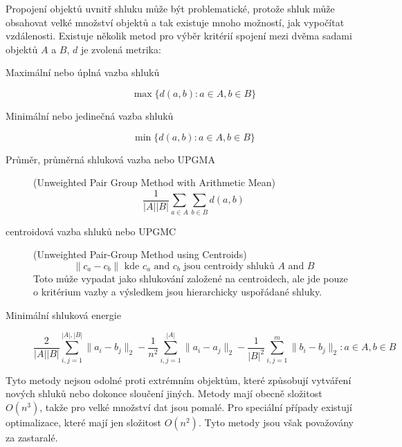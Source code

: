 \begin{description}
Propojení objektů uvnitř shluku může být problematické, protože shluk může obsahovat velké množství objektů a tak existuje mnoho možností, jak vypočítat vzdálenosti. Existuje několik metod pro výběr kritérií spojení mezi dvěma sadami objektů $A$ a $B$, $d$ je zvolená metrika:
\begin{description}
\item[Maximální nebo úplná vazba shluků] $$\max\{d(a,b) : a \in A, b \in B\}$$
\item[Minimální nebo jedinečná vazba shluků] $$\min\{d(a,b) : a \in A, b \in B\}$$
\item[Průměr, průměrná shluková vazba nebo UPGMA] (Unweighted Pair Group Method with Arithmetic Mean) $$\frac{1}{|A||B|}\sum_{a \in A} \sum_{b \in B} d(a,b)$$
\item[centroidová vazba shluků nebo UPGMC] (Unweighted Pair-Group Method using Centroids) $$\|c_a - c_b\| \mbox{ kde } c_a \mbox{ and } c_b \mbox{ jsou centroidy shluků } A \mbox{ and } B$$
Toto může vypadat jako shlukování založené na centroidech, ale jde pouze o kritérium vazby a výsledkem jsou hierarchicky uspořádané shluky.
\item[Minimální shluková energie] $$\frac{2}{|A||B|}\sum_{i,j=1}^{|A|,|B|}\|a_i-b_j\|_2-\frac{1}{n^2}\sum_{i,j=1}^{|A|}\|a_i-a_j\|_2-\frac{1}{|B|^2}\sum_{i,j=1}^{m}\|b_{i}-b_{j}\|_{2} : a \in A, b \in B$$
\end{description}

Tyto metody nejsou odolné proti extrémním objektům, které způsobují vytváření nových shluků nebo dokonce sloučení jiných. Metody mají obecně složitost $O(n^3) $, takže pro velké množství dat jsou pomalé. Pro speciální případy existují optimalizace, které mají jen složitost $O(n^2) $. Tyto metody jsou však považovány za zastaralé.


\end{description}
